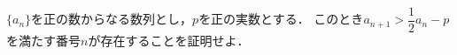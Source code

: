 \documentclass[../../main.tex]{subfiles}
\begin{document}
$\{a_n\}$を正の数からなる数列とし，$p$を正の実数とする．
このとき$a_{n+1}>\dfrac{1}{2}a_n-p$を満たす番号$n$が存在することを証明せよ．
\end{document}
